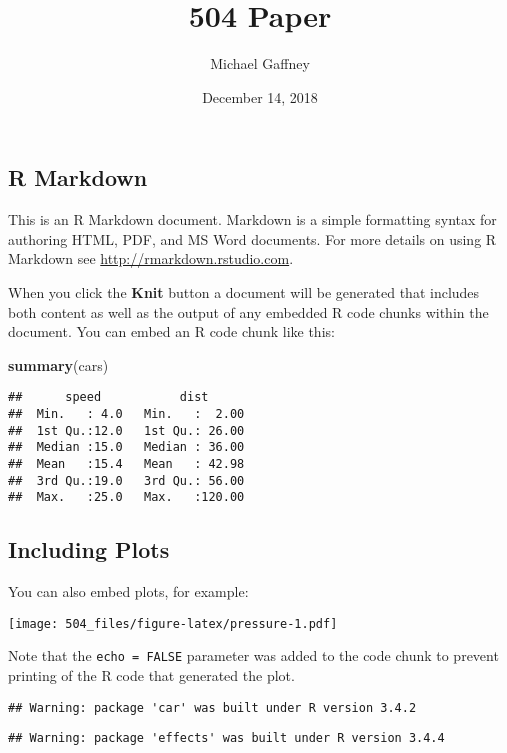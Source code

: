 \documentclass[]{article}
\title{504 Paper}
\author{Michael Gaffney}
\date{December 14, 2018}
\newenvironment{Shaded}{\begin{snugshade}}{\end{snugshade}}
\newcommand{\KeywordTok}[1]{\textcolor[rgb]{0.13,0.29,0.53}{\textbf{{#1}}}}
\newcommand{\NormalTok}[1]{{#1}}
\begin{document}
\maketitle

\subsection{R Markdown}\label{r-markdown}

This is an R Markdown document. Markdown is a simple formatting syntax
for authoring HTML, PDF, and MS Word documents. For more details on
using R Markdown see \url{http://rmarkdown.rstudio.com}.

When you click the \textbf{Knit} button a document will be generated
that includes both content as well as the output of any embedded R code
chunks within the document. You can embed an R code chunk like this:

\begin{Shaded}
\begin{Highlighting}[]
\KeywordTok{summary}\NormalTok{(cars)}
\end{Highlighting}
\end{Shaded}

\begin{verbatim}
##      speed           dist       
##  Min.   : 4.0   Min.   :  2.00  
##  1st Qu.:12.0   1st Qu.: 26.00  
##  Median :15.0   Median : 36.00  
##  Mean   :15.4   Mean   : 42.98  
##  3rd Qu.:19.0   3rd Qu.: 56.00  
##  Max.   :25.0   Max.   :120.00
\end{verbatim}

\subsection{Including Plots}\label{including-plots}

You can also embed plots, for example:

\texttt{[image: 504\_files/figure-latex/pressure-1.pdf]}

Note that the \texttt{echo\ =\ FALSE} parameter was added to the code
chunk to prevent printing of the R code that generated the plot.

\begin{verbatim}
## Warning: package 'car' was built under R version 3.4.2
\end{verbatim}

\begin{verbatim}
## Warning: package 'effects' was built under R version 3.4.4
\end{verbatim}
\end{document}
